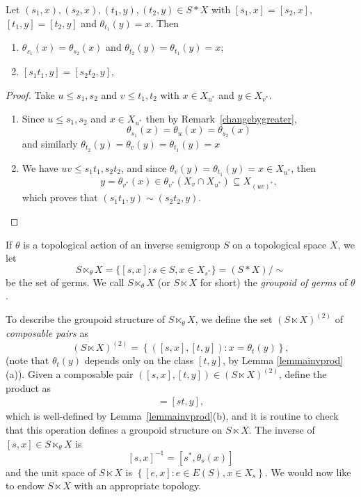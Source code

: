 \begin{lemma}\label{lemmainvprod}
Let $(s_1,x), (s_2,x), (t_1,y), (t_2,y) \in S\ast X$ with $[s_1,x]=[s_2,x]$, $[t_1,y]=[t_2,y]$ and $\theta_{t_1}(y)=x$. Then 
\begin{enumerate}\setlength\itemsep{1ex}
\item[(a)] $\theta_{s_1}(x)=\theta_{s_2}(x)$ and $\theta_{t_2}(y)=\theta_{t_1}(y)=x$;
\item[(b)]  $[s_1t_1,y]=[s_2t_2,y]$,
\end{enumerate}
\end{lemma}
\begin{proof}
Take $u\leq s_1,s_2$ and $v\leq t_1,t_2$ with $x\in X_{u^*}$ and $y\in X_{v^*}$.
\begin{enumerate}\setlength\itemsep{1ex}
\item[(a)] Since $u\leq s_1,s_2$ and $x\in X_{u^*}$ then by Remark~\ref{changebygreater},
\[\theta_{s_1}(x)=\theta_u(x)=\theta_{s_2}(x)\]
and similarly $\theta_{t_2}(y)=\theta_v(y)=\theta_{t_1}(y)=x$ 

\item[(b)] We have $uv\leq s_1t_1,s_2t_2$, and since $\theta_v(y)=\theta_{t_1}(y)=x\in X_{u^*}$, then
\[y=\theta_{v^*}(x)\in \theta_{v^*}(X_v\cap X_{u^*})\subseteq X_{(uv)^*},\]
which proves that $(s_1t_1,y)\sim (s_2t_2, y)$. \qedhere
\end{enumerate}
\end{proof}

\begin{definition}
If $\theta$ is a topological action of an inverse semigroup $S$ on a topological space $X$, we let
\[S\ltimes_\theta X =\{[s,x]:s\in S,x\in X_{s^*}\}=(S\ast X)/\sim\]
be the set of germs. We call $S\ltimes_\theta X$ (or $S\ltimes X$ for short) the \emph{groupoid of germs} of $\theta$.
\end{definition}

To describe the groupoid structure of $S\ltimes_\theta X$, we define the set $(S\ltimes X)^{(2)}$ of \emph{composable pairs} as
\[(S\ltimes X)^{(2)}=\left\lbrace([s,x],[t,y]):x=\theta_t(y)\right\rbrace,\]
(note that $\theta_t(y)$ depends only on the class $[t,y]$, by Lemma \ref{lemmainvprod}(a)). Given a composable pair $([s,x],[t,y])\in(S\ltimes X)^{(2)}$, define the product as
\begin{align*}%
[s,x][t,y]=[st,y],
\end{align*}
which is well-defined by Lemma~\ref{lemmainvprod}(b), and it is routine to check that this operation defines a groupoid structure on $S\ltimes X$. The inverse of $[s,x]\in S\ltimes_\theta X$ is
\[[s,x]^{-1}=[s^*,\theta_s(x)]\]
and the unit space of $S\ltimes X$ is $\left\{[e,x]:e\in E(S), x\in X_s\right\}$. We would now like to endow $S\ltimes X$ with an appropriate topology.

